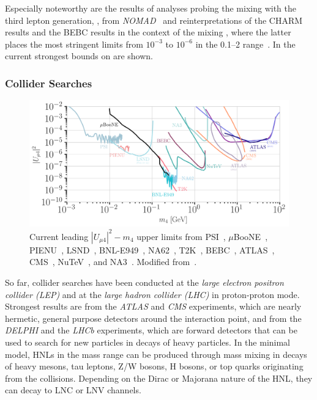 Especially noteworthy are the results of analyses probing the mixing with the third lepton generation, , from \textit{NOMAD}~ and reinterpretations of the CHARM results and the BEBC results in the context of the mixing , where the latter places the most stringent limits from $10^{-3}$ to $10^{-6}$ in the \SIrange{0.1}{2}{\gev} range~. In  the current strongest bounds on  are shown.


\subsubsection{Collider Searches}

\begin{figure}[t]
    \includegraphics{figures/hnl_simulation/theory/UmuN_majorana.png}
      \caption[Current leading $|U_{\mu4}|^2-m_4$ upper limits]{Current leading $|U_{\mu4}|^2-m_4$ upper limits from PSI~\cite{PSI_Daum:1987bg}, $\mu$BooNE~\cite{MicroBooNE:2023eef}, PIENU~\cite{pienu_Bryman:2019bjg}, LSND~\cite{lsnd_Ema:2023buz}, BNL-E949~\cite{BNL_E949:2014gsn}, NA62~\cite{NA62:2022pyf}, T2K~\cite{T2K:2019jwa}, BEBC~\cite{BEBC_OG_COOPERSARKAR1985207},
      ATLAS~\cite{ATLAS:2019kpx, atlas_2022_HNL_PhysRevLett.131.061803}, CMS~\cite{CMS:2018iaf, CMS:2022fut}, NuTeV~\cite{NuTeV:1999kej}, and NA3~\cite{NA3:1986ahv}. Modified from~\cite{hoster_limitFernandez-Martinez:2023phj}.}
\end{figure}


So far, collider searches have been conducted at the \textit{large electron positron collider (LEP)} and at the \textit{large hadron collider (LHC)} in proton-proton mode. Strongest results are from the \textit{ATLAS} and \textit{CMS} experiments, which are nearly hermetic, general purpose detectors around the interaction point, and from the \textit{DELPHI} and the \textit{LHCb} experiments, which are forward detectors that can be used to search for new particles in decays of heavy particles. In the minimal model, HNLs in the \si{\gev} mass range can be produced through mass mixing in decays of heavy mesons, tau leptons, Z/W bosons, H bosons, or top quarks originating from the collisions. Depending on the Dirac or Majorana nature of the HNL, they can decay to LNC or LNV channels.

